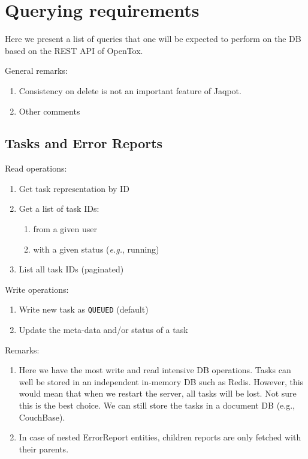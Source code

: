 \chapter{Querying requirements}



\noindent Here we present a list of queries that one will be expected 
to perform on the DB based on the REST API of OpenTox.

\noindent General remarks:
\begin{enumerate}
 \item Consistency on delete is not an important feature of Jaqpot.
 \item Other comments
\end{enumerate}


\section{Tasks and Error Reports}

\noindent Read operations:
\begin{enumerate}
 \item Get task representation by ID
 \item Get a list of task IDs:
    \begin{enumerate}
    \item from a given user
    \item with a given status (\textit{e.g.}, running)
    \end{enumerate}
 \item List all task IDs (paginated)
\end{enumerate}

\noindent Write operations:
\begin{enumerate}
 \item Write new task as \texttt{QUEUED} (default)
 \item Update the meta-data and/or status of a task
\end{enumerate}

\noindent Remarks:
\begin{enumerate}
 \item 	Here we have the most write and read intensive DB 
	operations. Tasks can well be stored in an independent 
	in-memory DB such as Redis. However, this would mean 
	that when we restart the server, all tasks will be lost. 
	Not sure this is the best choice. We can still store the 
	tasks in a document DB (e.g., CouchBase).
 \item 	In case of nested ErrorReport entities, children reports are 
        only fetched with their parents.
\end{enumerate}



